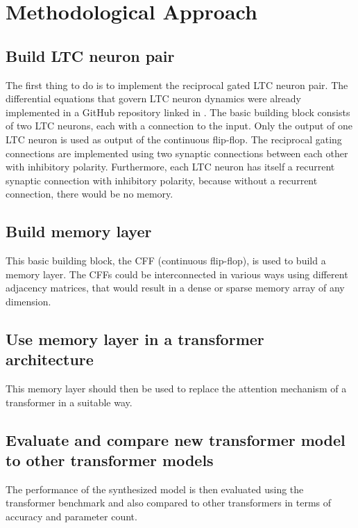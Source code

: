 \documentclass{article}
\begin{document}
\section{Methodological Approach}
\subsection{Build LTC neuron pair}
The first thing to do is to implement the reciprocal gated LTC neuron pair. 
The differential equations that govern LTC neuron dynamics were already implemented in a GitHub repository linked in \cite{NCP}. The basic building block consists of two LTC neurons, each with a connection to the input. 
Only the output of one LTC neuron is used as output of the continuous flip-flop. 
The reciprocal gating connections are implemented using two synaptic connections between each other with inhibitory polarity. 
Furthermore, each LTC neuron has itself a recurrent synaptic connection with inhibitory polarity, because without a recurrent connection, there would be no memory.
\subsection{Build memory layer}
This basic building block, the CFF (continuous flip-flop), is used to build a memory layer. 
The CFFs could be interconnected in various ways using different adjacency matrices, that would result in a dense or sparse memory array of any dimension.
\subsection{Use memory layer in a transformer architecture}
This memory layer should then be used to replace the attention mechanism of a transformer in a suitable way.
\subsection{Evaluate and compare new transformer model to other transformer models}
The performance of the synthesized model is then evaluated using the transformer benchmark \cite{TransformerBenchmark} and also compared to other transformers in terms of accuracy and parameter count.
\end{document}
